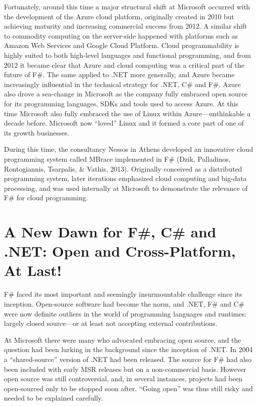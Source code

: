 \documentclass[acmsmall]{acmart}\settopmatter{}
\begin{document}
Fortunately, around this time a major structural shift at Microsoft occurred with the development of the Azure cloud platform,
originally created in 2010 but achieving maturity and increasing commercial success from 2012.  A similar shift to commodity
computing on the server-side happened with platforms such as Amazon Web Services and Google Cloud Platform.   Cloud
programmability is highly suited to both high-level languages and functional programming, and from 2012 it became clear that
Azure and cloud computing was a critical part of the future of F\#. The same applied to .NET more generally, and Azure
became increasingly influential in the technical strategy for .NET, C\# and F\#.  Azure also drove a sea-change in Microsoft
as the company fully embraced open source for its programming languages, SDKs and tools used to access Azure. At this
time Microsoft also fully embraced the use of Linux within Azure---unthinkable a decade before.  Microsoft now “loved” Linux
and it formed a core part of one of its growth businesses.

During this time, the consultancy Nessos in Athens developed an innovative cloud programming system called MBrace
implemented in F\# (Dzik, Palladinos, Rontogiannis, Tsarpalis, \& Vathis, 2013). Originally conceived as a distributed
programming system, later iterations emphasized cloud computing and big-data processing, and was used internally at
Microsoft to demonstrate the relevance of F\# for cloud programming. 


\section*{A New Dawn for F\#, C\# and .NET: Open and Cross-Platform, At Last!}

F\# faced its most important and seemingly insurmountable challenge since its inception. Open-source software had
become the norm, and .NET, F\# and C\# were now definite outliers in the world of programming languages and
runtimes: largely closed source---or at least not accepting external contributions.  

At Microsoft there were many who advocated embracing open source, and the question had been lurking in the
background since the inception of .NET. In 2004 a “shared-source” version of .NET had been released. The source
for F\# had also been included with early MSR releases but on a non-commercial basis. However open source was
still controversial, and, in several instances, projects had been open-sourced only to be stopped soon
after.  “Going open” was thus still risky and needed to be explained carefully. 
\end{document}
